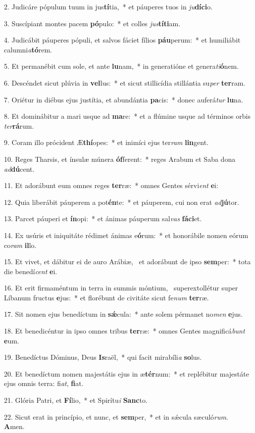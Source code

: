 2. Judicáre pópulum tuum in jus\textbf{tí}tia,~*  et páuperes tuos in \textit{ju}\textbf{dí}\textbf{ci}o.\

3. Suscípiant montes pacem \textbf{pó}pulo:~*  et colles \textit{jus}\textbf{tí}\textbf{ti}am.\

4. Judicábit páuperes pópuli, et salvos fáciet fílios \textbf{páu}perum:~*  et humiliábit calumni\textit{a}\textbf{tó}rem.\

5. Et permanébit cum sole, et ante \textbf{lu}nam,~*  in generatióne et genera\textit{ti}\textbf{ó}nem.\

6. Descéndet sicut plúvia in \textbf{vel}lus:~*  et sicut stillicídia stillántia su\textit{per} \textbf{ter}ram.\

7. Oriétur in diébus ejus justítia, et abundántia \textbf{pa}cis:~*  donec auferá\textit{tur} \textbf{lu}na.\

8. Et dominábitur a mari usque ad \textbf{ma}re:~*  et a flúmine usque ad términos orbis \textit{ter}\textbf{rá}rum.\

9. Coram illo prócident Æ\textbf{thí}opes:~*  et inimíci ejus ter\textit{ram} \textbf{lin}gent.\

10. Reges Tharsis, et ínsulæ múnera \textbf{óf}ferent:~*  reges Arabum et Saba dona \textit{ad}\textbf{dú}cent.\

11. Et adorábunt eum omnes reges \textbf{ter}ræ:~*  omnes Gentes sérvi\textit{ent} \textbf{e}i:\

12. Quia liberábit páuperem a pot\textbf{én}te:~*  et páuperem, cui non erat \textit{ad}\textbf{jú}tor.\

13. Parcet páuperi et \textbf{ín}opi:~*  et ánimas páuperum sal\textit{vas} \textbf{fá}\textbf{ci}et.\

14. Ex usúris et iniquitáte rédimet ánimas e\textbf{ó}rum:~*  et honorábile nomen eórum co\textit{ram} \textbf{il}lo.\

15. Et vivet, et dábitur ei de auro Arábiæ, \dag\  et adorábunt de ipso \textbf{sem}per:~*  tota die benedí\textit{cent} \textbf{e}i.\

16. Et erit firmaméntum in terra in summis móntium, \dag\  superextollétur super Líbanum fructus \textbf{e}jus:~*  et florébunt de civitáte sicut fe\textit{num} \textbf{ter}ræ.\

17. Sit nomen ejus benedíctum in \textbf{sǽ}cula:~*  ante solem pérmanet no\textit{men} \textbf{e}jus.\

18. Et benedicéntur in ipso omnes tribus \textbf{ter}ræ:~*  omnes Gentes magnificá\textit{bunt} \textbf{e}um.\

19. Benedíctus Dóminus, Deus \textbf{Is}raël,~*  qui facit mirabíli\textit{a} \textbf{so}lus.\

20. Et benedíctum nomen majestátis ejus in æ\textbf{tér}num:~*  et replébitur majestáte ejus omnis terra: fi\textit{at}, \textbf{fi}at.\

21. Glória Patri, et \textbf{Fí}lio,~*  et Spirítu\textit{i} \textbf{Sanc}to.\

22. Sicut erat in princípio, et nunc, et \textbf{sem}per,~*  et in sǽcula sæculó\textit{rum}. \textbf{A}men.\


